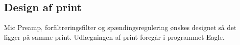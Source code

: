 \subsection*{Design af print}
Mic Preamp, forfiltreringsfilter og spændingsregulering ønskes designet så det ligger på samme print. Udlægningen af print foregår i programmet Eagle. 




